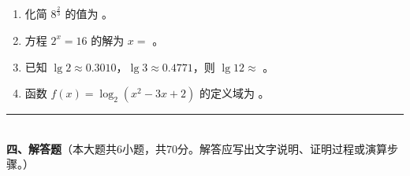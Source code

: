 \documentclass[12pt, a4paper]{ctexart}
\begin{document}
\vspace{6pt}

\begin{enumerate}[resume]
\item 化简 $8^{\frac{2}{3}}$ 的值为 \underline{\hspace{2cm}}。

\item 方程 $2^x=16$ 的解为 $x=$ \underline{\hspace{2cm}}。

\item 已知 $\lg 2\approx 0.3010$，$\lg 3\approx 0.4771$，则 $\lg 12\approx$ \underline{\hspace{3cm}}。

\item 函数 $f(x)=\log_2(x^2-3x+2)$ 的定义域为 \underline{\hspace{4cm}}。
\end{enumerate}

\vspace{6pt}

\noindent\rule{\textwidth}{0.4pt}\\[2pt]
{\large\bfseries 四、解答题}（本大题共6小题，共70分。解答应写出文字说明、证明过程或演算步骤。）

\vspace{6pt}
\end{document}
